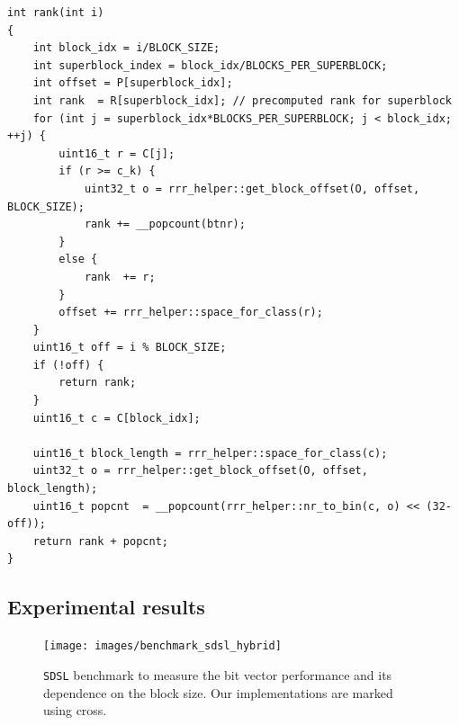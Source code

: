 \begin{lstlisting}
int rank(int i)
{
	int block_idx = i/BLOCK_SIZE;
	int superblock_index = block_idx/BLOCKS_PER_SUPERBLOCK;
	int offset = P[superblock_idx];
	int rank  = R[superblock_idx]; // precomputed rank for superblock
	for (int j = superblock_idx*BLOCKS_PER_SUPERBLOCK; j < block_idx; ++j) {
		uint16_t r = C[j];
		if (r >= c_k) {
			uint32_t o = rrr_helper::get_block_offset(O, offset, BLOCK_SIZE);
			rank += __popcount(btnr);
		}
		else {
			rank  += r;
		}
		offset += rrr_helper::space_for_class(r);
	}
	uint16_t off = i % BLOCK_SIZE;
	if (!off) {
		return rank;
	}
	uint16_t c = C[block_idx];

	uint16_t block_length = rrr_helper::space_for_class(c);
	uint32_t o = rrr_helper::get_block_offset(O, offset, block_length);
	uint16_t popcnt  = __popcount(rrr_helper::nr_to_bin(c, o) << (32-off));
	return rank + popcnt;
}
\end{lstlisting}

\subsection{Experimental results}

\begin{figure}
	\centerline{
		\texttt{[image: images/benchmark\_sdsl\_hybrid]}
	}
	\caption[TODO]{\texttt{SDSL} benchmark to measure the bit vector performance and its dependence
	on the block size. Our implementations are marked using cross.
	}
	\label{obr:benchmark_sdsl_hybrid}
\end{figure}
